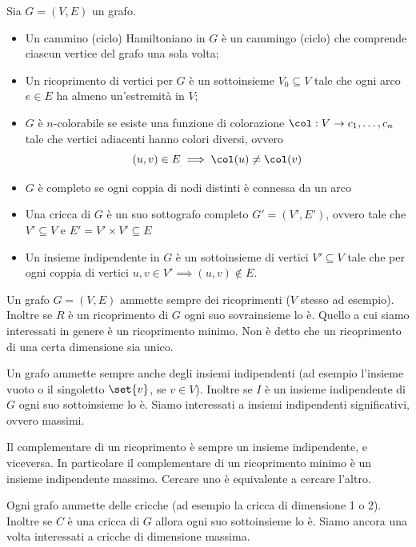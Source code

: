\begin{defn}
    Sia $G = (V,E)$ un grafo.
    \begin{itemize}
        \item Un cammino (ciclo) Hamiltoniano in $G$ è un cammingo (ciclo) che comprende ciascun
        vertice del grafo una sola volta;
        \item Un ricoprimento di vertici per $G$ è un sottoinsieme $V_{0} \subseteq V$ tale che
        ogni arco $e \in E$ ha almeno un'estremità in $V$;
        \item $G$ è $n$-colorabile se esiste una funzione di colorazione $\col: V \to
        c_{1},\dotsc,c_{n}$ tale che vertici adiacenti hanno colori diversi, ovvero
        \begin{equation*}
            (u,v) \in E \implies \col(u) \not= \col(v)
        \end{equation*}
        \item $G$ è completo se ogni coppia di nodi distinti è connessa da un arco
        \item Una cricca di $G$ è un suo sottografo completo $G' = (V',E')$, ovvero tale che $V'
        \subseteq V$ e $E' = V' \times V' \subseteq E$
        \item Un insieme indipendente in $G$ è un sottoinsieme di vertici $V' \subseteq V$ tale che
        per ogni coppia di vertici $u,v \in V' \implies (u,v) \notin E$.
    \end{itemize}
\end{defn}

Un grafo $G=(V,E)$ ammette sempre dei ricoprimenti ($V$ stesso ad esempio). Inoltre se $R$ è un
ricoprimento di $G$ ogni suo sovrainsieme lo è. Quello a cui siamo interessati in genere è un ricoprimento
minimo. Non è detto che un ricoprimento di una certa dimensione sia unico.

Un grafo ammette sempre anche degli insiemi indipendenti (ad esempio l'insieme vuoto o il singoletto
$\set{v}$, se $v \in V$). Inoltre se $I$ è un insieme indipendente di $G$ ogni suo sottoinsieme lo
è. Siamo interessati a insiemi indipendenti significativi, ovvero massimi.

Il complementare di un ricoprimento è sempre un insieme indipendente, e viceversa. In particolare il
complementare di un ricoprimento minimo è un insieme indipendente massimo. Cercare uno è
equivalente a cercare l'altro.

Ogni grafo ammette delle cricche (ad esempio la cricca di dimensione 1 o 2). Inoltre se $C$ è una
cricca di $G$ allora ogni suo sottoinsieme lo è. Siamo ancora una volta interessati a cricche di
dimensione massima.

